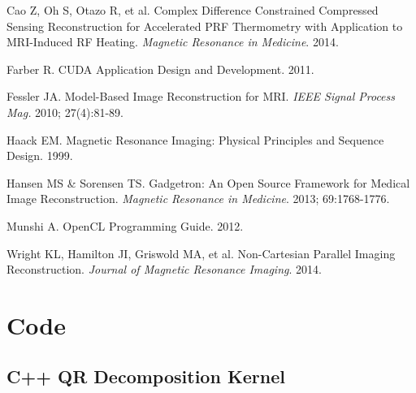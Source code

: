 \documentclass{article}
\begin{document}
\begin{thebibliography}{9}

	Cao Z, Oh S, Otazo R, et al.
	Complex Difference Constrained Compressed Sensing Reconstruction for Accelerated PRF Thermometry with Application to MRI-Induced RF Heating.
	\emph{Magnetic Resonance in Medicine}.
	2014.

	Farber R.
	CUDA Application Design and Development.
	2011.

	Fessler JA.
	Model-Based Image Reconstruction for MRI.
	\emph{IEEE Signal Process Mag.}
	2010;
	27(4):81-89.

	Haack EM.
	Magnetic Resonance Imaging: Physical Principles and Sequence Design.
	1999.

	Hansen MS \& Sorensen TS.
	Gadgetron: An Open Source Framework for Medical Image Reconstruction.
	\emph{Magnetic Resonance in Medicine}.
	2013;
	69:1768-1776.

	Munshi A.
	OpenCL Programming Guide.
	2012.

	Wright KL, Hamilton JI, Griswold MA, et al.
	Non-Cartesian Parallel Imaging Reconstruction.
	\emph{Journal of Magnetic Resonance Imaging}.
	2014.

\end{thebibliography}

\appendix
\section{Code}

\subsection{C++ QR Decomposition Kernel}
\end{document}
